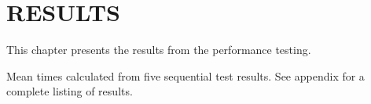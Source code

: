 \chapter{RESULTS}
This chapter presents the results from the performance testing.

 Mean times calculated from five
  sequential test results.
  See appendix for a complete listing of results.
  
  
